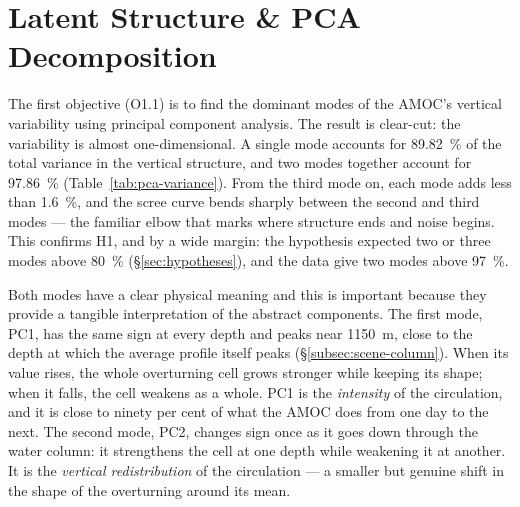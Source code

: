 \section{Latent Structure \& PCA Decomposition}
\label{sec:detect-pca}
 
The first objective (O1.1) is to find the dominant modes of the AMOC's vertical variability using principal component analysis. The result is clear-cut: the variability is almost one-dimensional. A single mode accounts for \SI{89.82}{\percent} of the total variance in the vertical structure, and two modes together account for \SI{97.86}{\percent} (Table~\ref{tab:pca-variance}). From the third mode on, each mode adds less than \SI{1.6}{\percent}, and the scree curve bends sharply between the second and third modes --- the familiar elbow that marks where structure ends and noise begins. This confirms H1, and by a wide margin: the hypothesis expected two or three modes above \SI{80}{\percent} (\S\ref{sec:hypotheses}), and the data give two modes above \SI{97}{\percent}.
 


 
Both modes have a clear physical meaning and this is important because they provide a tangible interpretation of the abstract components. The first mode, PC1, has the same sign at every depth and peaks near 1150~m, close to the depth at which the average profile itself peaks (\S\ref{subsec:scene-column}). When its value rises, the whole overturning cell grows stronger while keeping its shape; when it falls, the cell weakens as a whole. PC1 is the \emph{intensity} of the circulation, and it is close to ninety per cent of what the AMOC does from one day to the next. The second mode, PC2, changes sign once as it goes down through the water column: it strengthens the cell at one depth while weakening it at another. It is the \emph{vertical redistribution} of the circulation --- a smaller but genuine shift in the shape of the overturning around its mean.


 
